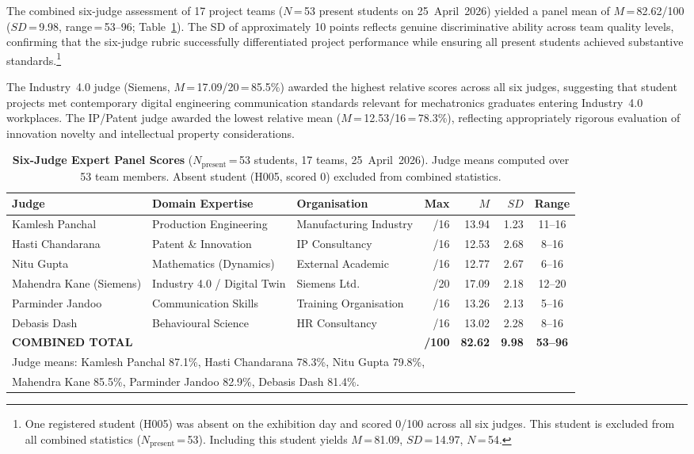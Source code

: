 \documentclass[utf8]{FrontiersinHarvard}
\begin{document}
The combined six-judge assessment of 17 project teams ($N$\,=\,53 present
students on 25~April~2026) yielded a panel mean of $M$\,=\,82.62/100
($SD$\,=\,9.98, range\,=\,53--96; Table~\ref{tab:rubric}). The SD of
approximately 10 points reflects genuine discriminative ability across
team quality levels, confirming that the six-judge rubric successfully
differentiated project performance while ensuring all present students
achieved substantive standards.\footnote{One registered student (H005) was
absent on the exhibition day and scored 0/100 across all six judges. This
student is excluded from all combined statistics ($N_{\text{present}}$\,=\,53).
Including this student yields $M$\,=\,81.09, $SD$\,=\,14.97, $N$\,=\,54.}

The Industry~4.0 judge (Siemens, $M$\,=\,17.09/20\,=\,85.5\%) awarded the
highest relative scores across all six judges, suggesting that student
projects met contemporary digital engineering communication standards relevant
for mechatronics graduates entering Industry~4.0 workplaces. The IP/Patent
judge awarded the lowest relative mean ($M$\,=\,12.53/16\,=\,78.3\%),
reflecting appropriately rigorous evaluation of innovation novelty and
intellectual property considerations.

\begin{table}[h]
\caption{\textbf{Six-Judge Expert Panel Scores} ($N_{\text{present}}$\,=\,53
students, 17 teams, 25~April~2026). Judge means computed over 53 team
members. Absent student (H005, scored 0) excluded from combined statistics.}
\label{tab:rubric}
\begin{tabular}{lllrrrc}
\toprule
\textbf{Judge} & \textbf{Domain Expertise} & \textbf{Organisation} &
\textbf{Max} & $M$ & $SD$ & \textbf{Range} \\
\midrule
Kamlesh Panchal         & Production Engineering      & Manufacturing Industry & /16 & 13.94 & 1.23 & 11--16 \\
Hasti Chandarana        & Patent \& Innovation        & IP Consultancy         & /16 & 12.53 & 2.68 & 8--16  \\
Nitu Gupta              & Mathematics (Dynamics)      & External Academic      & /16 & 12.77 & 2.67 & 6--16  \\
Mahendra Kane (Siemens) & Industry 4.0 / Digital Twin & Siemens Ltd.           & /20 & 17.09 & 2.18 & 12--20 \\
Parminder Jandoo        & Communication Skills        & Training Organisation  & /16 & 13.26 & 2.13 & 5--16  \\
Debasis Dash            & Behavioural Science         & HR Consultancy         & /16 & 13.02 & 2.28 & 8--16  \\
\midrule
\textbf{COMBINED TOTAL} &                             &                        & \textbf{/100} &
\textbf{82.62} & \textbf{9.98} & \textbf{53--96} \\
\bottomrule
\multicolumn{7}{l}{\small Judge means: Kamlesh Panchal 87.1\%, Hasti Chandarana 78.3\%, Nitu Gupta 79.8\%,} \\
\multicolumn{7}{l}{\small Mahendra Kane 85.5\%, Parminder Jandoo 82.9\%, Debasis Dash 81.4\%.}
\end{tabular}
\end{table}
\end{document}
